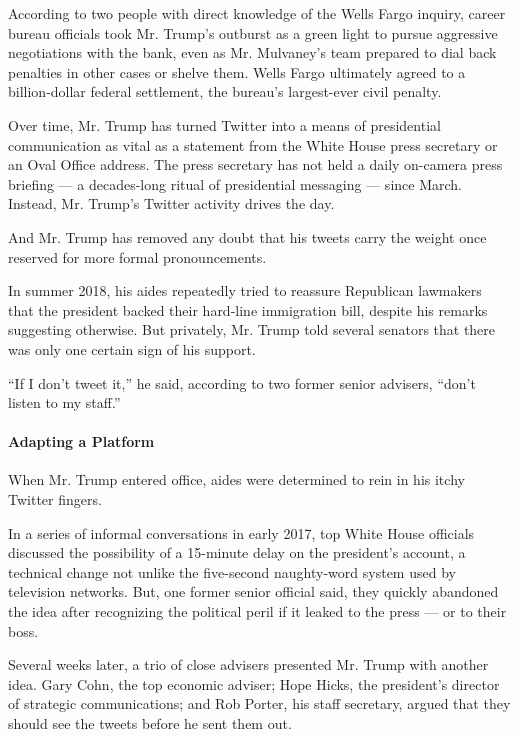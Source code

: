According to two people with direct knowledge of the Wells Fargo
inquiry, career bureau officials took Mr. Trump's outburst as a green
light to pursue aggressive negotiations with the bank, even as Mr.
Mulvaney's team prepared to dial back penalties in other cases or shelve
them. Wells Fargo ultimately agreed to a billion-dollar federal
settlement, the bureau's largest-ever civil penalty.

Over time, Mr. Trump has turned Twitter into a means of presidential
communication as vital as a statement from the White House press
secretary or an Oval Office address. The press secretary has not held a
daily on-camera press briefing --- a decades-long ritual of presidential
messaging --- since March. Instead, Mr. Trump's Twitter activity drives
the day.

And Mr. Trump has removed any doubt that his tweets carry the weight
once reserved for more formal pronouncements.

In summer 2018, his aides repeatedly tried to reassure Republican
lawmakers that the president backed their hard-line immigration bill,
despite his remarks suggesting otherwise. But privately, Mr. Trump told
several senators that there was only one certain sign of his support.

``If I don't tweet it,'' he said, according to two former senior
advisers, ``don't listen to my staff.''

\hypertarget{adapting-a-platform}{%
\paragraph{Adapting a Platform}\label{adapting-a-platform}}

When Mr. Trump entered office, aides were determined to rein in his
itchy Twitter fingers.

In a series of informal conversations in early 2017, top White House
officials discussed the possibility of a 15-minute delay on the
president's account, a technical change not unlike the five-second
naughty-word system used by television networks. But, one former senior
official said, they quickly abandoned the idea after recognizing the
political peril if it leaked to the press --- or to their boss.

Several weeks later, a trio of close advisers presented Mr. Trump with
another idea. Gary Cohn, the top economic adviser; Hope Hicks, the
president's director of strategic communications; and Rob Porter, his
staff secretary, argued that they should see the tweets before he sent
them out.

